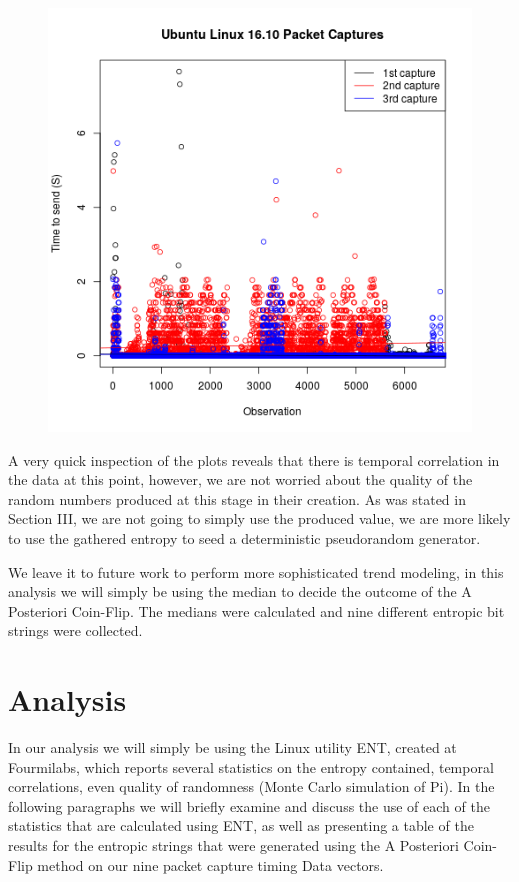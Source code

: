 \documentclass{IEEEtran}
\begin{document}
\begin{figure}[H]
\begin{center}
\includegraphics[scale=0.3]{Micah2.png}
\end{center}

\end{figure}

A very quick inspection of the plots reveals that there is  temporal correlation in the data at this point, however, we are not worried about the quality of the random numbers produced at this stage in their creation. As was stated in Section III, we are not going to simply use the produced value, we are more likely to use the gathered entropy to seed a deterministic pseudorandom generator. 

We leave it to future work to perform more sophisticated trend modeling, in this analysis we will simply be using the median to decide the outcome of the A Posteriori Coin-Flip. The medians were calculated and nine different entropic bit strings were collected. 

\section{Analysis}
In our analysis we will simply be using the Linux utility ENT, created at Fourmilabs, which reports several statistics on the entropy contained, temporal correlations, even quality of randomness (Monte Carlo simulation of Pi). In the following paragraphs we will briefly examine and discuss the use of each of the statistics that are calculated using ENT, as well as presenting a table of the results for the entropic strings that were generated using the A Posteriori Coin-Flip method on our nine packet capture timing Data vectors. 
\end{document}
